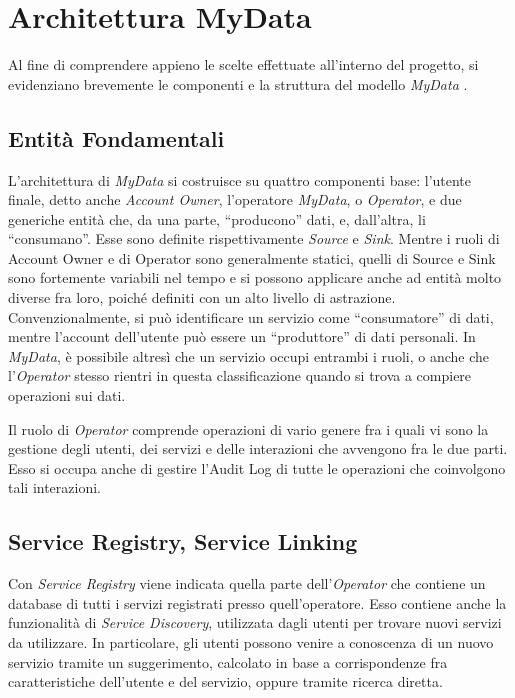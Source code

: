 \chapter{Architettura MyData}
\label{capitolo3}
\thispagestyle{empty}

\noindent Al fine di comprendere appieno le scelte effettuate all’interno del progetto, si evidenziano brevemente le componenti e la struttura del modello \textit{MyData} \cite{githubmydatastack}. 

\section{Entit\`a Fondamentali}
L’architettura di \textit{MyData} si costruisce su quattro componenti base: l’utente finale, detto anche \textit{Account Owner}, l’operatore \textit{MyData}, o \textit{Operator}, e due generiche entit\`a che, da una parte, “producono” dati, e, dall’altra, li “consumano”. Esse sono definite rispettivamente \textit{Source} e \textit{Sink}. Mentre i ruoli di Account Owner e di Operator sono generalmente statici, quelli di Source e Sink sono fortemente variabili nel tempo e si possono applicare anche ad entit\`a molto diverse fra loro, poich\'e definiti con un alto livello di astrazione. Convenzionalmente, si pu\`o identificare un servizio come “consumatore” di dati, mentre l’account dell’utente pu\`o essere un “produttore” di dati personali. In \textit{MyData}, \`e possibile altres\`i che un servizio occupi entrambi i ruoli, o anche che l’\textit{Operator} stesso rientri in questa classificazione quando si trova a compiere operazioni sui dati.

Il ruolo di \textit{Operator} comprende operazioni di vario genere fra i quali vi sono la gestione degli utenti, dei servizi e delle interazioni che avvengono fra le due parti. Esso si occupa anche di gestire l’Audit Log di tutte le operazioni che coinvolgono tali interazioni.

\section{Service Registry, Service Linking}
Con \textit{Service Registry} viene indicata quella parte dell’\textit{Operator} che contiene un database di tutti i servizi registrati presso quell’operatore. Esso contiene anche la funzionalit\`a di \textit{Service Discovery}, utilizzata dagli utenti per trovare nuovi servizi da utilizzare. In particolare, gli utenti possono venire a conoscenza di un nuovo servizio tramite un suggerimento, calcolato in base a corrispondenze fra caratteristiche dell’utente e del servizio, oppure tramite ricerca diretta.

